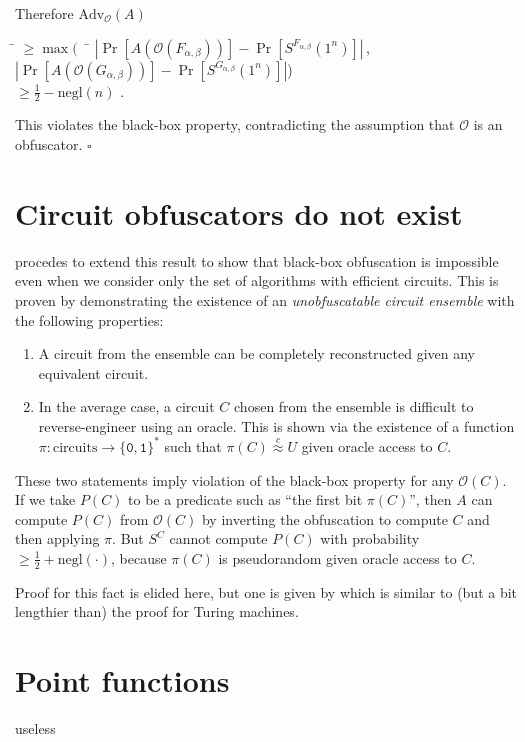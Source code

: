 \documentclass[10pt,twocolumn]{article}
\newcommand{\abs}[1]{{\ensuremath{\left\vert#1\right\vert}}}
\def\zero{\texttt{0}}
\def\one{\texttt{1}}
\def\bit{{\ensuremath{\{\zero,\one\}}}}
\def\obf{\ensuremath{\mathcal{O}}}
\def\negl{\text{negl}}
\def\cind{{\ensuremath{\stackrel{c}{\approx}}}}
\def\Adv{\text{Adv}}
\def\qed{\hfill \ensuremath{\square}}
\begin{document}
    Therefore $\Adv_\obf(A)$
    \begin{tabbing}
      \hspace{2em} \= $\ge \max(\;\;$ \= $\abs{ \Pr[ A(\obf(F_{\alpha,\beta})) ] - \Pr[ S^{F_{\alpha,\beta}}(1^n) ] }$\,, \\[5pt]
                   \>                 \> $\abs{ \Pr[ A(\obf(G_{\alpha,\beta})) ] - \Pr[ S^{G_{\alpha,\beta}}(1^n) ] }$\;\;) \\[5pt]
                   \> $\ge \frac{1}{2} - \negl(n)$ .
    \end{tabbing}
    This violates the black-box property, contradicting the assumption that $\obf$ is an obfuscator. \qed

    \section{Circuit obfuscators do not exist}

    \cite{onThe(Im)possibility} procedes to extend this result to show that black-box obfuscation is
    impossible even when we consider only the set of algorithms with efficient circuits.
    This is proven by demonstrating the existence of an \textit{unobfuscatable circuit ensemble}
    with the following properties:%

    \begin{enumerate}
      \item A circuit from the ensemble can be completely reconstructed given any equivalent circuit.
      \item In the average case, a circuit $C$ chosen from the ensemble is difficult to reverse-engineer using an oracle.
      This is shown via the existence of a function $\pi: \text{circuits}\to\bit^*$ such that $\pi(C)\cind U$
      given oracle access to $C$.
    \end{enumerate}

    These two statements imply violation of the black-box property for any $\obf(C)$.
    If we take $P(C)$ to be a predicate such as ``the first bit $\pi(C)$'',
    then $A$ can compute $P(C)$ from $\obf(C)$ by inverting the obfuscation to compute $C$ and then applying $\pi$.
    But $S^C$ cannot compute $P(C)$ with probability $\ge \frac{1}{2}+\negl(\cdot)$,
    because $\pi(C)$ is pseudorandom given oracle access to $C$.

    Proof for this fact is elided here, but one is given by \cite{onThe(Im)possibility}
    which is similar to (but a bit lengthier than) the proof for Turing machines.

  \section{Point functions}

    useless

  

  
\end{document}
